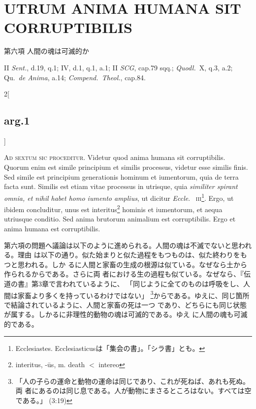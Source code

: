 \documentclass[paper=a4paper,fontsize=10pt,jafontsize=9pt,titlepage]{jlreq}
\begin{document}
\newpage

\section{UTRUM ANIMA HUMANA SIT CORRUPTIBILIS}

{\Large 第六項 人間の魂は可滅的か}

{\footnotesize II {\itshape Sent.}, d.19, q.1; IV, d.1, q.1,
a.1; II {\itshape SCG}, cap.79 sqq.; {\itshape Quodl.}~X, q.3, a.2;
Qu.~{\itshape de Anima}, a.14; {\itshape Compend.~Theol.}, cap.84.}


\vspace{2em}
\begin{paracol}{2}[\subsection{arg.1}]

{\scshape Ad sextum sic proceditur}. Videtur quod anima humana sit
corruptibilis. Quorum enim est simile principium et similis processus, videtur
esse similis finis. Sed simile est principium generationis hominum et
iumentorum, quia de terra facta sunt. Similis est etiam vitae processus in
utrisque, quia {\itshape similiter spirant omnia, et nihil habet homo iumento
amplius}, ut dicitur {\itshape Eccle}.~{\scshape
iii}\footnote{Ecclesiastes. Ecclesiasticusは「集会の書」。「シラ書」とも。}.
Ergo, ut ibidem concluditur, unus est interitus\footnote{interitus, -\={u}s,
m. death $<$ intereo} hominis et iumentorum, et aequa utriusque conditio. Sed
anima brutorum animalium est corruptibilis. Ergo et anima humana est
corruptibilis.

\switchcolumn

第六項の問題へ議論は以下のように進められる。人間の魂は不滅でないと思われる。理由
は以下の通り。似た始まりと似た過程をもつものは、似た終わりをもつと思われる。しか
るに人間と家畜の生成の根源は似ている。なぜなら土から作られるからである。さらに両
者における生の過程も似ている。なぜなら、『伝道の書』第3章で言われているように、
「同じように全てのものは呼吸をし、人間は家畜より多くを持っているわけではない」
\footnote{「人の子らの運命と動物の運命は同じであり、これが死ねば、あれも死ぬ。両
者にあるのは同じ息である。人が動物にまさるところはない。すべては空である。」
(3:19)}からである。ゆえに、同じ箇所で結論されているように、人間と家畜の死は一つ
であり、どちらにも同じ状態が属する。しかるに非理性的動物の魂は可滅的である。ゆえ
に人間の魂も可滅的である。






\end{paracol}
\end{document}
